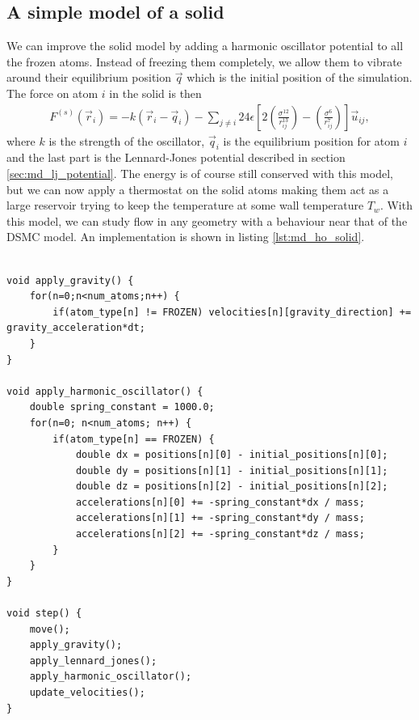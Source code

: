 \subsection{A simple model of a solid}
\label{sec:md_simple_model_of_a_solid}
We can improve the solid model by adding a harmonic oscillator potential to all the frozen atoms. Instead of freezing them completely, we allow them to vibrate around their equilibrium position $\vec q$ which is the initial position of the simulation. The force on atom $i$ in the solid is then
\begin{align}
	F^{(s)}(\vec r_i) = -k(\vec r_i - \vec q_i) 
	- \sum_{j\neq i} 24\epsilon\left[2\left(\frac{\sigma^{12}}{r_{ij}^{13}}\right) - \left(\frac{\sigma^6}{r_{ij}^7}\right)\right]\vec u_{ij},
\end{align}
where $k$ is the strength of the oscillator, $\vec q_i$ is the equilibrium position for atom $i$ and the last part is the Lennard-Jones potential described in section \ref{sec:md_lj_potential}. The energy is of course still conserved with this model, but we can now apply a thermostat on the solid atoms making them act as a large reservoir trying to keep the temperature at some wall temperature $T_w$. With this model, we can study flow in any geometry with a behaviour near that of the DSMC model. An implementation is shown in listing \ref{lst:md_ho_solid}.

\begin{lstlisting}[caption=Implementation of the harmonic oscillator model of a solid., label=lst:md_ho_solid]

void apply_gravity() {
    for(n=0;n<num_atoms;n++) {
        if(atom_type[n] != FROZEN) velocities[n][gravity_direction] += gravity_acceleration*dt;
    }
}

void apply_harmonic_oscillator() {
    double spring_constant = 1000.0;
    for(n=0; n<num_atoms; n++) {
        if(atom_type[n] == FROZEN) {
            double dx = positions[n][0] - initial_positions[n][0];
            double dy = positions[n][1] - initial_positions[n][1];
            double dz = positions[n][2] - initial_positions[n][2];
            accelerations[n][0] += -spring_constant*dx / mass;
            accelerations[n][1] += -spring_constant*dy / mass;
            accelerations[n][2] += -spring_constant*dz / mass;
        }
    }
}

void step() {
    move();
    apply_gravity();
    apply_lennard_jones();
    apply_harmonic_oscillator();
    update_velocities();
}
\end{lstlisting}